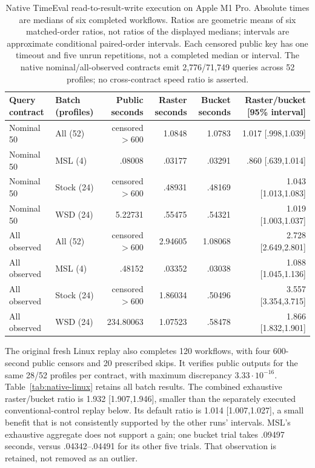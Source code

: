 \begin{table}[t]\centering\small
\begin{tabular}{llrrrr}\toprule
Query contract & Batch (profiles) & Public seconds & Raster seconds & Bucket seconds & Raster/bucket [95\% interval]\\\midrule
Nominal 50 & All (52) & censored $>600$ & 1.0848 & 1.0783 & 1.017 [.998,1.039]\\
Nominal 50 & MSL (4) & .08008 & .03177 & .03291 & .860 [.639,1.014]\\
Nominal 50 & Stock (24) & censored $>600$ & .48931 & .48169 & 1.043 [1.013,1.083]\\
Nominal 50 & WSD (24) & 5.22731 & .55475 & .54321 & 1.019 [1.003,1.037]\\
All observed & All (52) & censored $>600$ & 2.94605 & 1.08068 & 2.728 [2.649,2.801]\\
All observed & MSL (4) & .48152 & .03352 & .03038 & 1.088 [1.045,1.136]\\
All observed & Stock (24) & censored $>600$ & 1.86034 & .50496 & 3.557 [3.354,3.715]\\
All observed & WSD (24) & 234.80063 & 1.07523 & .58478 & 1.866 [1.832,1.901]\\
\bottomrule\end{tabular}
\caption{Native TimeEval read-to-result-write execution on Apple M1 Pro.
Absolute times are medians of six completed workflows. Ratios are geometric
means of six matched-order ratios, not ratios of the displayed medians;
intervals are approximate conditional paired-order intervals. Each censored
public key has one timeout and five unrun repetitions, not a completed median
or interval. The native nominal/all-observed contracts emit 2,776/71,749 queries
across 52 profiles; no cross-contract speed ratio is asserted.}
\label{tab:native-mac}\end{table}

The original fresh Linux replay also completes 120 workflows, with four
600-second public censors and 20 prescribed skips. It verifies public outputs
for the same 28/52 profiles per contract, with maximum discrepancy
$3.33\cdot10^{-16}$. Table~\ref{tab:native-linux} retains all batch results.
The combined exhaustive raster/bucket ratio is 1.932 [1.907,1.946], smaller
than the separately executed conventional-control replay below. Its default
ratio is 1.014 [1.007,1.027], a small benefit that is not consistently supported
by the other runs' intervals. MSL's exhaustive aggregate does not support a
gain; one bucket trial takes .09497 seconds, versus .04342--.04491 for its
other five trials. That observation is retained, not removed as an outlier.

